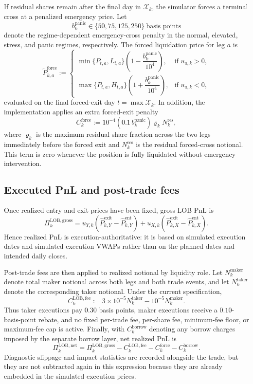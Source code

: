 \documentclass[11pt,a4paper]{article}
\begin{document}
If residual shares remain after the final day in \(\mathcal X_k\), the
simulator forces a terminal cross at a penalized emergency price. Let
\[
  b_k^{\mathrm{panic}}
  \in \{50,75,125,250\}\ \text{basis points}
\]
denote the regime-dependent emergency-cross penalty in the normal, elevated,
stress, and panic regimes, respectively. The forced liquidation price for leg
\(a\) is
\[
  \widetilde P_{k,a}^{\mathrm{force}}
  :=
  \begin{cases}
    \min\{P_{t,a},L_{t,a}\}
    \left(
      1-\dfrac{b_k^{\mathrm{panic}}}{10^{4}}
    \right),
    & \text{if } u_{a,k}>0,\\[1.2ex]
    \max\{P_{t,a},H_{t,a}\}
    \left(
      1+\dfrac{b_k^{\mathrm{panic}}}{10^{4}}
    \right),
    & \text{if } u_{a,k}<0,
  \end{cases}
\]
evaluated on the final forced-exit day \(t=\max\mathcal X_k\). In addition, the
implementation applies an extra forced-exit penalty
\[
  C_k^{\mathrm{force}}
  :=
  10^{-4}
  \left(
    0.1\,b_k^{\mathrm{panic}}
  \right)
  \varrho_k
  N_k^{\mathrm{res}},
\]
where \(\varrho_k\) is the maximum residual share fraction across the two legs
immediately before the forced exit and \(N_k^{\mathrm{res}}\) is the residual
forced-cross notional. This term is zero whenever the position is fully
liquidated without emergency intervention.

\subsection{Executed PnL and post-trade fees}

Once realized entry and exit prices have been fixed, gross LOB PnL is
\[
  \Pi_k^{\mathrm{LOB,gross}}
  =
  u_{Y,k}
  \left(
    \widehat P_{k,Y}^{\mathrm{exit}}
    -
    \widehat P_{k,Y}^{\mathrm{ent}}
  \right)
  +
  u_{X,k}
  \left(
    \widehat P_{k,X}^{\mathrm{exit}}
    -
    \widehat P_{k,X}^{\mathrm{ent}}
  \right).
\]
Hence realized PnL is execution-authoritative: it is based on simulated
execution dates and simulated execution VWAPs rather than on the planned dates
and intended daily closes.

Post-trade fees are then applied to realized notional by liquidity role. Let
\(N_k^{\mathrm{maker}}\) denote total maker notional across both legs and both
trade events, and let \(N_k^{\mathrm{taker}}\) denote the corresponding taker
notional. Under the current specification,
\[
  C_k^{\mathrm{LOB,fee}}
  :=
  3\times 10^{-5} N_k^{\mathrm{taker}}
  -
  10^{-5} N_k^{\mathrm{maker}}.
\]
Thus taker executions pay \(0.30\) basis points, maker executions receive a
\(0.10\)-basis-point rebate, and no fixed per-trade fee, per-share fee,
minimum-fee floor, or maximum-fee cap is active. Finally, with
\(C_k^{\mathrm{borrow}}\) denoting any borrow charges imposed by the separate
borrow layer, net realized PnL is
\[
  \Pi_k^{\mathrm{LOB,net}}
  =
  \Pi_k^{\mathrm{LOB,gross}}
  -
  C_k^{\mathrm{LOB,fee}}
  -
  C_k^{\mathrm{force}}
  -
  C_k^{\mathrm{borrow}}.
\]
Diagnostic slippage and impact statistics are recorded alongside the trade, but
they are not subtracted again in this expression because they are already
embedded in the simulated execution prices.
\end{document}
